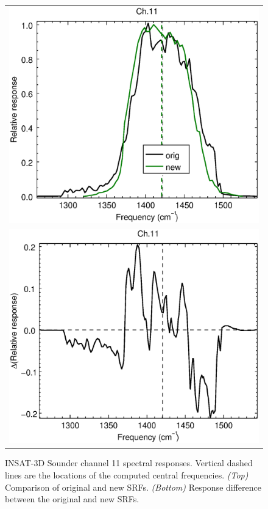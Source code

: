\begin{figure}[H]
  \centering
  \begin{tabular}{c}
    \includegraphics[scale=0.55]{graphics/sndr/srf/sndr_insat3d-11.eps} \\
    \includegraphics[scale=0.55]{graphics/sndr/srf/sndr_insat3d-11.difference.eps}
  \end{tabular}
  \caption{INSAT-3D Sounder channel 11 spectral responses. Vertical dashed lines are the locations of the computed central frequencies. \emph{(Top)} Comparison of original and new SRFs. \emph{(Bottom)} Response difference between the original and new SRFs.}
  \label{fig:sndr_ch11}
\end{figure}


